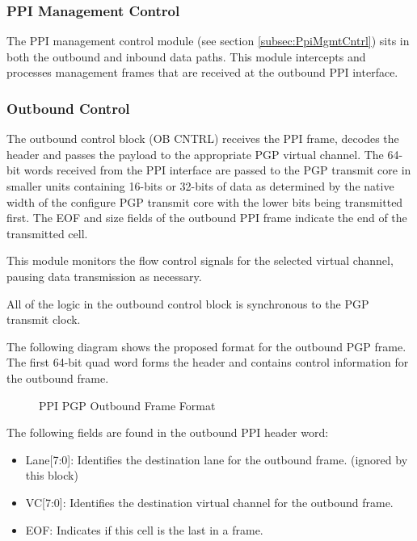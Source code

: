 \documentclass[11pt]{article}
\begin{document}
\subsubsection{PPI Management Control}

The PPI management control module (see section \ref{subsec:PpiMgmtCntrl}) sits in both the outbound and inbound data paths. 
This module intercepts and processes management frames that are received at the outbound PPI interface. 

\subsubsection{Outbound Control}

The outbound control block (OB CNTRL) receives the PPI frame, decodes the header and passes the payload to the appropriate PGP virtual
channel. The 64-bit words received from the PPI interface are passed to the PGP transmit core in smaller units containing
16-bits or 32-bits of data as determined by the native width of the configure PGP transmit core with the lower bits being
transmitted first.  The EOF and size fields of the outbound PPI frame indicate the end of the transmitted cell. 

This module monitors the flow control signals for the selected virtual channel, pausing data transmission as necessary.

All of the logic in the outbound control block is synchronous to the PGP transmit clock.

The following diagram shows the proposed format for the outbound PGP frame. The first 64-bit quad word forms the header and
contains control information for the outbound frame.

\begin{figure}[H]
   \centering
   \caption{PPI PGP Outbound Frame Format}
   \label{fig:ppi_ob_lane_frame}
\end{figure}

The following fields are found in the outbound PPI header word:

\begin{itemize}
   \item Lane[7:0]: Identifies the destination lane for the outbound frame. (ignored by this block)
   \item VC[7:0]: Identifies the destination virtual channel for the outbound frame.
   \item EOF: Indicates if this cell is the last in a frame.
\end{itemize}
\end{document}
